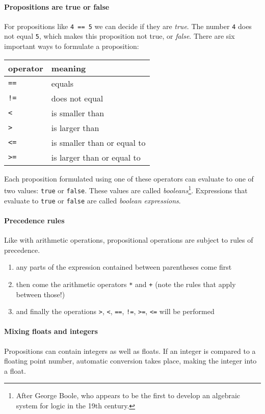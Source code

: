 \paragraph{Propositions are true or false}

For propositions like \texttt{4\,==\,5} we can decide if they are \emph{true}. The number \texttt{4} does not equal \texttt{5}, which makes this proposition not true, or \emph{false}. There are six important ways to formulate a proposition:

\begin{center}
\begin{tabular}{ll}
\textbf{operator} &        \textbf{meaning}\\
\midrule
      \texttt{==} &               equals\\
      \texttt{!=} &          does not equal\\
       \texttt{<} &              is smaller than\\
       \texttt{>} &               is larger than\\
      \texttt{<=} &  is smaller than or equal to\\
      \texttt{>=} &  is larger than or equal to\\
\midrule
\end{tabular}
\end{center}

Each proposition formulated using one of these operators can evaluate to one of two values: \texttt{true} or \texttt{false}. These values are called \emph{booleans}\footnote{After George Boole, who appears to be the first to develop an algebraic system for logic in the 19th century.}. Expressions that evaluate to \texttt{true} or \texttt{false} are called \emph{boolean expressions}.

\paragraph{Precedence rules}

Like with arithmetic operations, propositional operations are subject to rules of precedence.

\begin{enumerate}
    \item any parts of the expression contained between parentheses come first
    \item then come the arithmetic operators \texttt{*} and \texttt{+} (note the rules that apply between those!)
    \item and finally the operations \texttt{>}, \texttt{<}, \texttt{==}, \texttt{!=}, \texttt{>=}, \texttt{<=} will be performed
\end{enumerate}

\paragraph{Mixing floats and integers}

Propositions can contain integers as well as floats. If an integer is compared to a floating point number, automatic conversion takes place, making the integer into a float.
